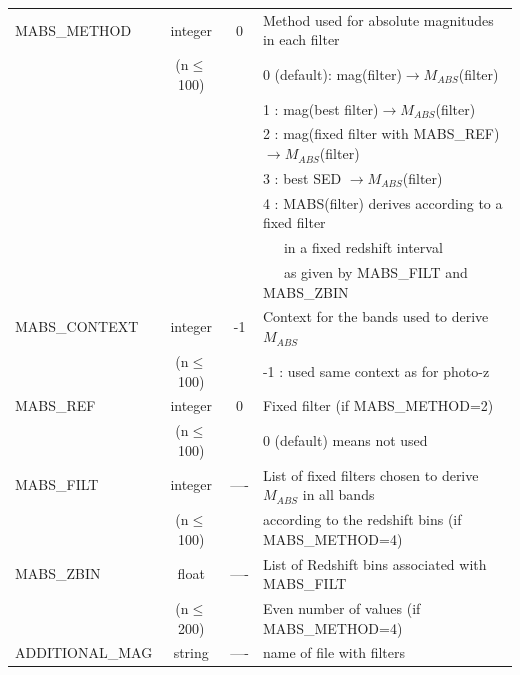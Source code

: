 \documentclass[12pt]{article}
\begin{document}
\begin{tabular}{lccl}
MABS\_METHOD  & integer &  0     &  Method used for absolute magnitudes in each filter       \\
                        & (n$\le$100)&         &  0 (default): mag(filter)$\rightarrow M_{ABS}$(filter)      \\
                                &           &         &  1 : mag(best filter)$\rightarrow M_{ABS}$(filter)           \\
                                &           &         &  2 : mag(fixed filter with MABS\_REF)$\rightarrow M_{ABS}$(filter) \\
                                 &         &          &  3 : best SED $\rightarrow M_{ABS}$(filter)                  \\
                                &         &          &  4 : MABS(filter) derives according to a fixed filter \\ 
	                        &         &         &  \ \ \   in a fixed redshift interval     \\
	                        &         &         &  \ \ \   as given by MABS\_FILT and MABS\_ZBIN     \\
%
MABS\_CONTEXT & integer & -1   &  Context for the bands used to derive $M_{ABS}$ \\
                               &(n$\le$100)&  & -1 : used same context as for photo-z \\
MABS\_REF         &  integer     & 0  &  Fixed filter  (if  MABS\_METHOD=2)                    \\
                             & (n$\le$100)&   &  0 (default) means  not used                                \\
%
MABS\_FILT         & integer & ----    &  List of  fixed filters chosen to derive $M_{ABS}$ in all bands    \\
	                    & (n$\le$100)&     &  according to the redshift bins  (if MABS\_METHOD=4)   \\ 
%
MABS\_ZBIN         &    float        &----&  List of Redshift bins associated with  MABS\_FILT            \\ 
	                     & (n$\le$200) &    &  Even number of values (if MABS\_METHOD=4)               \\ 
ADDITIONAL\_MAG  & string  & ----  &    name of file with filters  \\
\hline
\hline
\end{tabular}
%  
\end{document}
